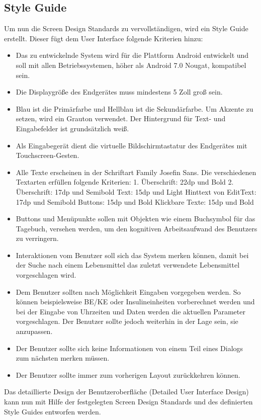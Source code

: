 \subsection{Style Guide}
Um nun die Screen Design Standards zu vervollständigen, wird ein Style Guide erstellt. Dieser fügt dem User Interface folgende Kriterien hinzu:
\begin{itemize}
	\item Das zu entwickelnde System wird für die Plattform Android entwickelt und soll mit allen Betriebssystemen, höher als Android 7.0 Nougat, kompatibel sein.
	\item Die Displaygröße des Endgerätes muss mindestens 5 Zoll groß sein.
	\item Blau ist die Primärfarbe und Hellblau ist die Sekundärfarbe. Um Akzente zu setzen, wird ein Grauton verwendet. Der Hintergrund für Text- und Eingabefelder ist grundsätzlich weiß.
	\item Als Eingabegerät dient die virtuelle Bildschirmtastatur des Endgerätes mit Touchscreen-Gesten.
	\item Alle Texte erscheinen in der Schriftart \glqq Family Josefin Sans\grqq{}. Die verschiedenen Textarten erfüllen folgende Kriterien:\newline
	\noindent\hspace*{10mm}1. Überschrift: 22dp und Bold\newline 
	\noindent\hspace*{10mm}2. Überschrift: 17dp und Semibold\newline 
	\noindent\hspace*{10mm}Text: 15dp und Light\newline
	\noindent\hspace*{10mm}Hinttext von EditText: 17dp und Semibold\newline
	\noindent\hspace*{10mm}Buttons: 15dp und Bold\newline 
	\noindent\hspace*{10mm}Klickbare Texte: 15dp und Bold 
	\item Buttons und Menüpunkte sollen mit Objekten wie einem Buchsymbol für das Tagebuch, versehen werden, um den kognitiven Arbeitsaufwand des Benutzers zu verringern.
	\item Interaktionen vom Benutzer soll sich das System merken können, damit bei der Suche nach einem Lebensmittel das zuletzt verwendete Lebensmittel vorgeschlagen wird.
	\item Dem Benutzer sollten nach Möglichkeit Eingaben vorgegeben werden. So können beispielsweise BE/KE oder Insulineinheiten vorberechnet werden und bei der Eingabe von Uhrzeiten und Daten werden die aktuellen Parameter vorgeschlagen. Der Benutzer sollte jedoch weiterhin in der Lage sein, sie anzupassen.
	\item Der Benutzer sollte sich keine Informationen von einem Teil eines Dialogs zum nächsten merken müssen.
	\item Der Benutzer sollte immer zum vorherigen Layout zurückkehren können.
\end{itemize}
Das detaillierte Design der Benutzeroberfläche (Detailed User Interface Design) kann nun mit Hilfe der festgelegten Screen Design Standards und des definierten Style Guides entworfen werden.
